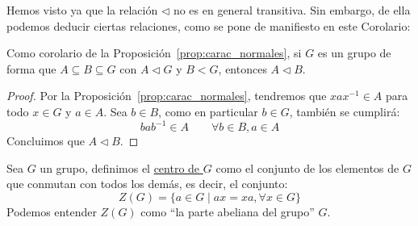 \noindent
Hemos visto ya que la relación $\lhd$ no es en general transitiva. Sin embargo, de ella podemos deducir ciertas relaciones, como se pone de manifiesto en este Corolario:
\begin{coro}\label{coro:trans_normales}
    Como corolario de la Proposición~\ref{prop:carac_normales}, si $G$ es un grupo de forma que $A\subseteq B\subseteq G$ con $A\lhd G$ y $B < G$, entonces $A \lhd B$.
    \begin{proof}
        Por la Proposición~\ref{prop:carac_normales}, tendremos que $xax^{-1}\in A$ para todo $x\in G$ y $a\in A$. Sea $b\in B$, como en particular $b\in G$, también se cumplirá:
        \begin{equation*}
            bab^{-1}\in A \qquad \forall b\in B, a\in A
        \end{equation*}
        Concluimos que $A\lhd B$.
    \end{proof}
\end{coro}

\begin{definicion}[Centro]
    Sea $G$ un grupo, definimos el \underline{centro de $G$} como el conjunto de los elementos de $G$ que conmutan con todos los demás, es decir, el conjunto:
    \begin{equation*}
        Z(G) = \{a\in G \mid ax = xa, \forall x\in G\}
    \end{equation*}
Podemos entender $Z(G)$ como ``la parte abeliana del grupo'' $G$.
\end{definicion}

